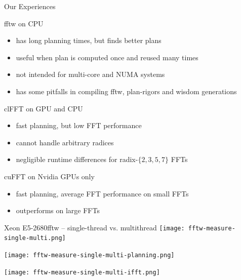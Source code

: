 \documentclass[t,11pt,hyperref={
  pdftitle = {gearshifft},
  pdfsubject = {gearshifft},
  pdfborder={0 0 0},
  colorlinks=true,
  urlcolor=red,
  citecolor=red,
  linkcolor=red,
  pdfauthor={Peter Steinbach, Matthias Werner}
  }
]{beamer}
\begin{document}
\appendix
{}

  
  


\begin{frame}{Our Experiences}{}

  fftw on CPU
  \begin{itemize}
  \item has long planning times, but finds better plans
  \item useful when plan is computed once and reused many times
  \item not intended for multi-core and NUMA systems
  \item has some pitfalls in compiling fftw, plan-rigors and wisdom generations
  \end{itemize}

  clFFT on GPU and CPU
  \begin{itemize}
  \item fast planning, but low FFT performance
  \item cannot handle arbitrary radices
  \item negligible runtime differences for radix-$\{2,3,5,7\}$ FFTs
  \end{itemize}

  cuFFT on Nvidia GPUs only
  \begin{itemize}
  \item fast planning, average FFT performance on small FFTs
  \item outperforms on large FFTs
  \end{itemize}
  
\end{frame}



\begin{frame}{Xeon E5-2680}{fftw -- single-thread vs. multithread}
  \texttt{[image: fftw-measure-single-multi.png]}
  
\vspace{-2em}  \texttt{[image: fftw-measure-single-multi-planning.png]}
  
\vspace{-2em}  \texttt{[image: fftw-measure-single-multi-ifft.png]}
\end{frame}
\end{document}
